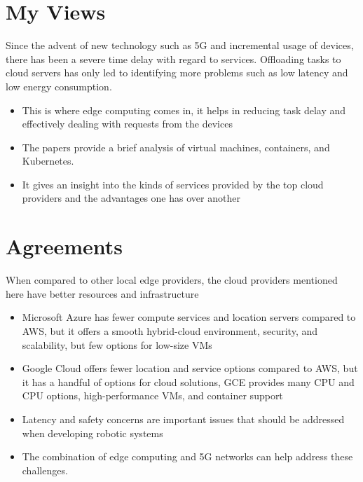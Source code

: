 \documentclass{article}
\begin{document}
\section{My Views}
Since the advent of new technology such as 5G and incremental usage of devices, there has been a severe time delay with regard to services. Offloading tasks to cloud servers has only led to identifying more problems such as low latency and low energy consumption.
\begin{itemize}
\item This is where edge computing comes in, it helps in reducing task delay and effectively dealing with requests from the devices
\end{itemize}
\begin{itemize}
\item The papers provide a brief analysis of virtual machines, containers, and Kubernetes.
\end{itemize}
\begin{itemize}
\item It gives an insight into the kinds of services provided by the top cloud providers and the advantages one has over another
\end{itemize}

\section{Agreements}
When compared to other local edge providers, the cloud providers mentioned here have better resources and infrastructure
\begin{itemize}
\item Microsoft Azure has fewer compute services and location servers compared to AWS, but it offers a smooth hybrid-cloud environment, security, and scalability, but few options for low-size VMs
\end{itemize}
\begin{itemize}
    \item Google Cloud offers fewer location and service options compared to AWS, but it has a handful of options for cloud solutions, GCE provides many CPU and CPU options, high-performance VMs, and container support
\end{itemize}
\begin{itemize}
    \item Latency and safety concerns are important issues that should be addressed when developing robotic systems
\end{itemize}
\begin{itemize}
    \item The combination of edge computing and 5G networks can help address these challenges.
\end{itemize}
\end{document}
